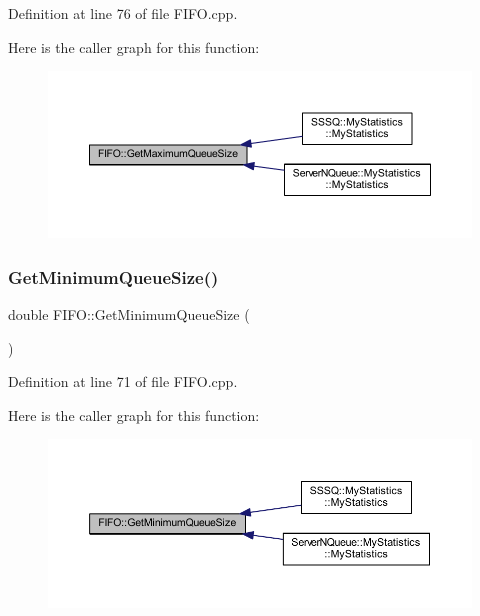 Definition at line 76 of file F\+I\+F\+O.\+cpp.

Here is the caller graph for this function\+:\nopagebreak
\begin{figure}[H]
\begin{center}
\leavevmode
\includegraphics[width=350pt]{class_f_i_f_o_a77a83086bafa4145487dd2918ed36aa4_icgraph}
\end{center}
\end{figure}
\mbox{\label{class_f_i_f_o_ad28e880c6365098995f45fc9f14121ef}} 
\subsubsection{\texorpdfstring{Get\+Minimum\+Queue\+Size()}{GetMinimumQueueSize()}}
{\footnotesize\ttfamily double F\+I\+F\+O\+::\+Get\+Minimum\+Queue\+Size (\begin{DoxyParamCaption}{ }\end{DoxyParamCaption})}



Definition at line 71 of file F\+I\+F\+O.\+cpp.

Here is the caller graph for this function\+:\nopagebreak
\begin{figure}[H]
\begin{center}
\leavevmode
\includegraphics[width=350pt]{class_f_i_f_o_ad28e880c6365098995f45fc9f14121ef_icgraph}
\end{center}
\end{figure}
\mbox{\label{class_f_i_f_o_a67cb60ba28bfe8efd4aae30c303aa296}} 
